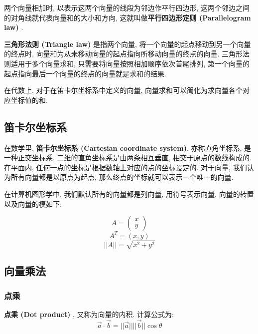 两个向量相加时, 以表示这两个向量的线段为邻边作平行四边形, 这两个邻边之间的对角线就代表向量和的大小和方向, 这就叫做\textbf{平行四边形定则 (Parallelogram law) }. 

\textbf{三角形法则 (Triangle law) }是指两个向量, 将一个向量的起点移动到另一个向量的终点时, 向量和为从未移动向量的起点指向所移动向量的终点的向量. 三角形法则适用于多个向量求和, 只需要将向量按照相加顺序依次首尾排列, 第一个向量的起点指向最后一个向量的终点的向量就是求和的结果. 

在代数上, 对于在笛卡尔坐标系中定义的向量, 向量求和可以简化为求向量各个对应坐标值的和. 

\subsection{笛卡尔坐标系}
在数学里, \textbf{笛卡尔坐标系 (Cartesian coordinate system)}, 亦称直角坐标系, 是一种正交坐标系. 二维的直角坐标系是由两条相互垂直, 相交于原点的数线构成的. 在平面内, 任何一点的坐标是根据数轴上对应的点的坐标设定的. 对于向量, 我们认为所有向量都是以原点为起点, 那么终点的坐标就可以表示一个唯一的向量. 

在计算机图形学中, 我们默认所有的向量都是列向量, 用符号表示向量, 向量的转置以及向量的模如下: 

\begin{equation}
A=\begin{pmatrix}
x\\ 
y
\end{pmatrix}
\end{equation}
\begin{equation}
A^T=(x,y)
\end{equation}
\begin{equation}
||A||=\sqrt{x^2+y^2}
\end{equation}

\subsection{向量乘法}

\subsubsection{点乘}

\textbf{点乘 (Dot product) }, 又称为向量的内积. 计算公式为: 
\begin{equation}
	\overrightarrow{a} \cdot \overrightarrow{b} = ||\overrightarrow{a}||||\overrightarrow{b}||\cos\theta
\end{equation}

